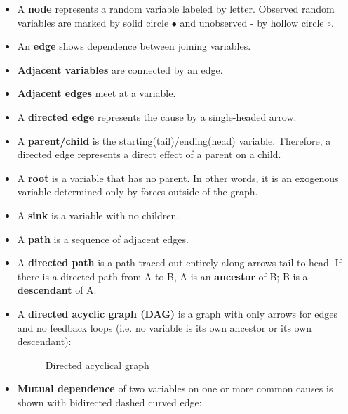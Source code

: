 \begin{itemize}

\item A \textbf{node} represents a random variable labeled by letter. Observed random variables are marked by solid circle $\bullet$ and unobserved - by hollow circle \( \circ \).

\item An \textbf{edge} shows dependence between joining variables.

\item \textbf{Adjacent variables} are connected by an edge.

\item \textbf{Adjacent edges} meet at a variable.

\item A \textbf{directed edge} represents the cause by a single-headed arrow.

\item A \textbf{parent/child} is the starting(tail)/ending(head) variable. Therefore, a directed edge represents a direct effect of a parent on a child.

\item A \textbf{root} is a variable that has no parent. In other words, it is an exogenous variable determined only by forces outside of the graph.

\item A \textbf{sink} is a variable with no children.

\item A \textbf{path} is a sequence of adjacent edges.

\item A \textbf{directed path} is a path traced out entirely along arrows tail-to-head. If there is a directed path from A to B,  A is an \textbf{ancestor} of B; B is a  \textbf{descendant} of A.

\item A \textbf{directed acyclic graph (DAG)} is a graph with only arrows for edges and no feedback loops (i.e. no variable is its own ancestor or its own descendant):

\begin{figure}[htp]\centering
\caption{Directed acyclical graph}
\end{figure}

\item \textbf{Mutual dependence} of two variables on one or more common causes is shown with bidirected dashed curved edge:


\end{itemize}
